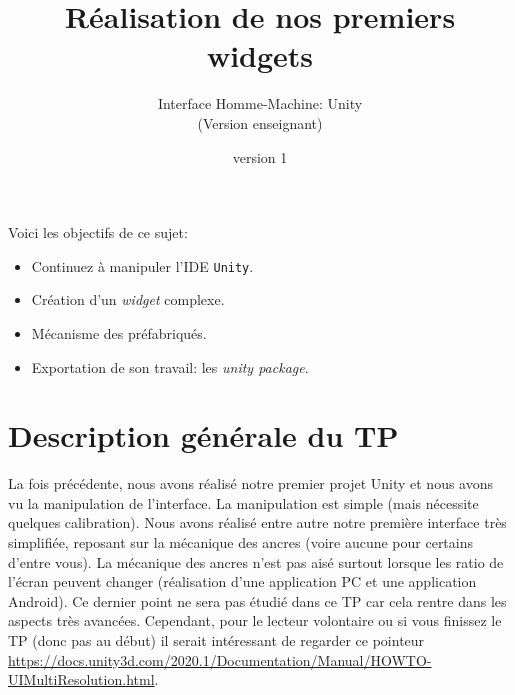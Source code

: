 \documentclass[a4paper,10pt]{article}
\newenvironment{attention}%
{\begin{tcolorbox}[breakable,colback=green!25!white,colframe=red!55!black,title=Attention]}%
{\end{tcolorbox}}
\begin{document}
	


\title{\vspace*{-1cm}Réalisation de nos premiers widgets}
\author{\vspace*{-1.5cm}Interface Homme-Machine: Unity
\begin{ensnote}
	(Version enseignant)
\end{ensnote}
}
\date{\vspace*{-1.5cm}version 1}
\maketitle
\thispagestyle{fancy}

Voici les objectifs de ce sujet:
\begin{itemize}
	\item Continuez à manipuler l'IDE \texttt{Unity}.
	\item Création d'un \textit{widget} complexe.
	\item Mécanisme des préfabriqués.
	\item Exportation de son travail: les \textit{unity package}.
\end{itemize}


%	

\section*{Description générale du TP}

La fois précédente, nous avons réalisé notre premier projet Unity et nous avons vu la manipulation de l'interface. La manipulation est simple (mais nécessite quelques calibration). Nous avons réalisé entre autre notre première interface très simplifiée, reposant sur la mécanique des ancres (voire aucune pour certains d'entre vous). La mécanique des ancres n'est pas aisé surtout lorsque les ratio de l'écran peuvent changer (réalisation d'une application PC et une application Android). Ce dernier point ne sera pas étudié dans ce TP car cela rentre dans les aspects très avancées. Cependant, pour le lecteur volontaire ou si vous finissez le TP (donc pas au début) il serait intéressant de regarder ce pointeur \url{https://docs.unity3d.com/2020.1/Documentation/Manual/HOWTO-UIMultiResolution.html}. 
\end{document}

